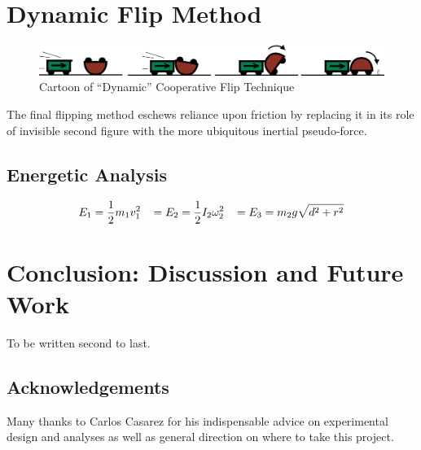 \documentclass[letterpaper]{report}
\begin{document}
\chapter{Dynamic Flip Method}
\begin{figure}[ht]
\centering
\includegraphics[width=1.0\textwidth]{Dynamic_CoopCartoon.png}
\caption{Cartoon of ``Dynamic'' Cooperative Flip Technique}
\end{figure}
The final flipping method eschews reliance upon friction by replacing it in its role of invisible second figure with the more ubiquitous inertial pseudo-force.

\section{Energetic Analysis}

\begin{align}
E_1 = \frac{1}{2} m_1 v_1^2 \hspace{3mm} = E_2 = \frac{1}{2} I_2 \omega_2^2 \hspace{3mm} = E_3 = m_2 g \sqrt{d^2+r^2}
\end{align}

\chapter{Conclusion: Discussion and Future Work}
To be written second to last.

\section{Acknowledgements}
Many thanks to Carlos Casarez for his indispensable advice on experimental design and analyses as well as general direction on where to take this project.



\end{document}
